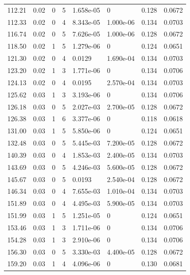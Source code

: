 \documentclass[preview]{standalone}
\begin{document}
{{{\begin{tabular}{L{1.2cm}C{1.2cm} C{0.3cm}C{0.5cm} C{1.4cm}C{1.4cm} C{1.4cm}C{1.4cm}}
  112.21  &  0.02  & 0     &  5 &  1.658e-05  & 0  & 0.128 &  0.0672   \\ 
  112.33  &  0.02  & 0     &  4 &  8.343e-05  & 1.000e-06  & 0.134 &  0.0703   \\ 
  116.74  &  0.02  & 0     &  5 &  7.626e-05  & 1.000e-06  & 0.128 &  0.0672   \\ 
  118.50  &  0.02  & 1     &  5 &  1.279e-06  & 0  & 0.124 &  0.0651   \\ 
  121.30  &  0.02  & 0     &  4 &  0.0129  & 1.690e-04  & 0.134 &  0.0703   \\ 
  123.20  &  0.02  & 1     &  3 &  1.771e-06  & 0  & 0.134 &  0.0706   \\ 
  124.13  &  0.02  & 0     &  4 &  0.0195  & 2.570e-04  & 0.134 &  0.0703   \\ 
  125.62  &  0.03  & 1     &  3 &  3.193e-06  & 0  & 0.134 &  0.0706   \\ 
  126.18  &  0.03  & 0     &  5 &  2.027e-03  & 2.700e-05  & 0.128 &  0.0672   \\ 
  126.38  &  0.03  & 1     &  6 &  3.377e-06  & 0  & 0.118 &  0.0618   \\ 
  131.00  &  0.03  & 1     &  5 &  5.850e-06  & 0  & 0.124 &  0.0651   \\ 
  132.48  &  0.03  & 0     &  5 &  5.445e-03  & 7.200e-05  & 0.128 &  0.0672   \\ 
  140.39  &  0.03  & 0     &  4 &  1.853e-03  & 2.400e-05  & 0.134 &  0.0703   \\ 
  143.69  &  0.03  & 0     &  5 &  4.246e-03  & 5.600e-05  & 0.128 &  0.0672   \\ 
  145.67  &  0.03  & 0     &  5 &  0.0193  & 2.540e-04  & 0.128 &  0.0672   \\ 
  146.34  &  0.03  & 0     &  4 &  7.655e-03  & 1.010e-04  & 0.134 &  0.0703   \\ 
  151.89  &  0.03  & 0     &  4 &  4.495e-03  & 5.900e-05  & 0.134 &  0.0703   \\ 
  151.99  &  0.03  & 1     &  5 &  1.251e-05  & 0  & 0.124 &  0.0651   \\ 
  153.46  &  0.03  & 1     &  3 &  1.711e-06  & 0  & 0.134 &  0.0706   \\ 
  154.28  &  0.03  & 1     &  3 &  2.910e-06  & 0  & 0.134 &  0.0706   \\ 
  156.30  &  0.03  & 0     &  5 &  3.330e-03  & 4.400e-05  & 0.128 &  0.0672   \\ 
  159.20  &  0.03  & 1     &  4 &  4.096e-06  & 0  & 0.130 &  0.0681   \\ 

\end{tabular}}}}
\end{document}
